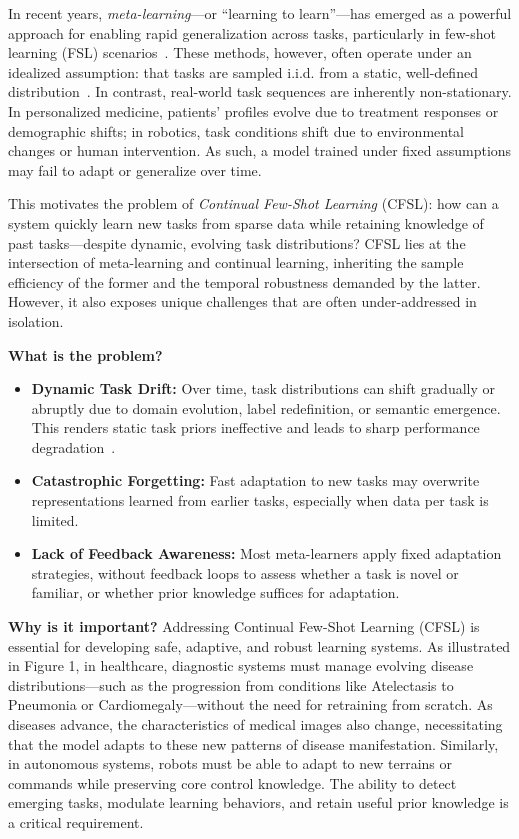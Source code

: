 \documentclass[conference]{IEEEtran}
\begin{document}
In recent years, \textit{meta-learning}—or “learning to learn”—has emerged as a powerful approach for enabling rapid generalization across tasks, particularly in few-shot learning (FSL) scenarios~\cite{finn2017maml,snell2017prototypical}. These methods, however, often operate under an idealized assumption: that tasks are sampled i.i.d. from a static, well-defined distribution~\cite{zhu2025continual,li2025ckpd}. In contrast, real-world task sequences are inherently non-stationary. In personalized medicine, patients' profiles evolve due to treatment responses or demographic shifts; in robotics, task conditions shift due to environmental changes or human intervention. As such, a model trained under fixed assumptions may fail to adapt or generalize over time.

This motivates the problem of \textit{Continual Few-Shot Learning} (CFSL): how can a system quickly learn new tasks from sparse data while retaining knowledge of past tasks—despite dynamic, evolving task distributions? CFSL lies at the intersection of meta-learning and continual learning, inheriting the sample efficiency of the former and the temporal robustness demanded by the latter. However, it also exposes unique challenges that are often under-addressed in isolation.

\vspace{0.5em}
\noindent\textbf{What is the problem?}
\begin{itemize}
    \item \textbf{Dynamic Task Drift:} Over time, task distributions can shift gradually or abruptly due to domain evolution, label redefinition, or semantic emergence. This renders static task priors ineffective and leads to sharp performance degradation~\cite{zhu2025continual}.
    \item \textbf{Catastrophic Forgetting:} Fast adaptation to new tasks may overwrite representations learned from earlier tasks, especially when data per task is limited.
    \item \textbf{Lack of Feedback Awareness:} Most meta-learners apply fixed adaptation strategies, without feedback loops to assess whether a task is novel or familiar, or whether prior knowledge suffices for adaptation.
\end{itemize}

\vspace{0.5em}
\noindent\textbf{Why is it important?}  
Addressing Continual Few-Shot Learning (CFSL) is essential for developing safe, adaptive, and robust learning systems. As illustrated in Figure 1, in healthcare, diagnostic systems must manage evolving disease distributions—such as the progression from conditions like Atelectasis to Pneumonia or Cardiomegaly—without the need for retraining from scratch. As diseases advance, the characteristics of medical images also change, necessitating that the model adapts to these new patterns of disease manifestation. Similarly, in autonomous systems, robots must be able to adapt to new terrains or commands while preserving core control knowledge. The ability to detect emerging tasks, modulate learning behaviors, and retain useful prior knowledge is %
a critical requirement.
\end{document}
